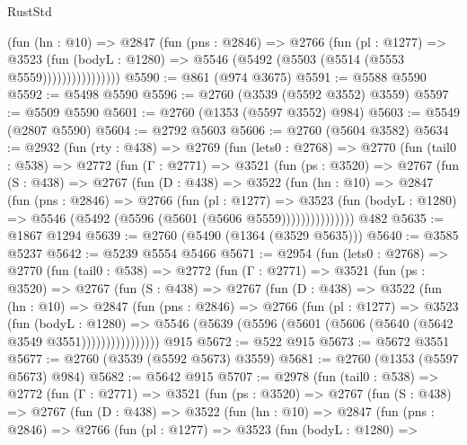 \begin{lexlean}{RustStd}
\begin{coremodule}
                    (fun (hn : @10) =>
                    @2847
                      (fun (pns : @2846) =>
                      @2766
                        (fun (pl : @1277) =>
                        @3523
                          (fun (bodyL : @1280) =>
                          @5546 (@5492 (@5503 (@5514 (@5553 @5559))))))))))))))))
@5590 := @861 (@974 @3675)
@5591 := @5588 @5590
@5592 := @5498 @5590
@5596 := @2760 (@3539 (@5592 @3552) @3559)
@5597 := @5509 @5590
@5601 := @2760 (@1353 (@5597 @3552) @984)
@5603 := @5549 (@2807 @5590)
@5604 := @2792 @5603
@5606 := @2760 (@5604 @3582)
@5634 := @2932
    (fun (rty : @438) =>
    @2769
      (fun (lets0 : @2768) =>
      @2770
        (fun (tail0 : @538) =>
        @2772
          (fun (Γ : @2771) =>
          @3521
            (fun (ps : @3520) =>
            @2767
              (fun (S : @438) =>
              @2767
                (fun (D : @438) =>
                @3522
                  (fun (hn : @10) =>
                  @2847
                    (fun (pns : @2846) =>
                    @2766
                      (fun (pl : @1277) =>
                      @3523
                        (fun (bodyL : @1280) =>
                        @5546 (@5492 (@5596 (@5601 (@5606 @5559)))))))))))))))
    @482
@5635 := @1867 @1294
@5639 := @2760 (@5490 (@1364 (@3529 @5635)))
@5640 := @3585 @5237
@5642 := @5239 @5554 @5466
@5671 := @2954
    (fun (lets0 : @2768) =>
    @2770
      (fun (tail0 : @538) =>
      @2772
        (fun (Γ : @2771) =>
        @3521
          (fun (ps : @3520) =>
          @2767
            (fun (S : @438) =>
            @2767
              (fun (D : @438) =>
              @3522
                (fun (hn : @10) =>
                @2847
                  (fun (pns : @2846) =>
                  @2766
                    (fun (pl : @1277) =>
                    @3523
                      (fun (bodyL : @1280) =>
                      @5546 (@5639 (@5596 (@5601 (@5606 (@5640 (@5642 @3549 @3551))))))))))))))))
    @915
@5672 := @522 @915
@5673 := @5672 @3551
@5677 := @2760 (@3539 (@5592 @5673) @3559)
@5681 := @2760 (@1353 (@5597 @5673) @984)
@5682 := @5642 @915
@5707 := @2978
    (fun (tail0 : @538) =>
    @2772
      (fun (Γ : @2771) =>
      @3521
        (fun (ps : @3520) =>
        @2767
          (fun (S : @438) =>
          @2767
            (fun (D : @438) =>
            @3522
              (fun (hn : @10) =>
              @2847
                (fun (pns : @2846) =>
                @2766
                  (fun (pl : @1277) =>
                  @3523
                    (fun (bodyL : @1280) =>

\end{coremodule}
\end{lexlean}
